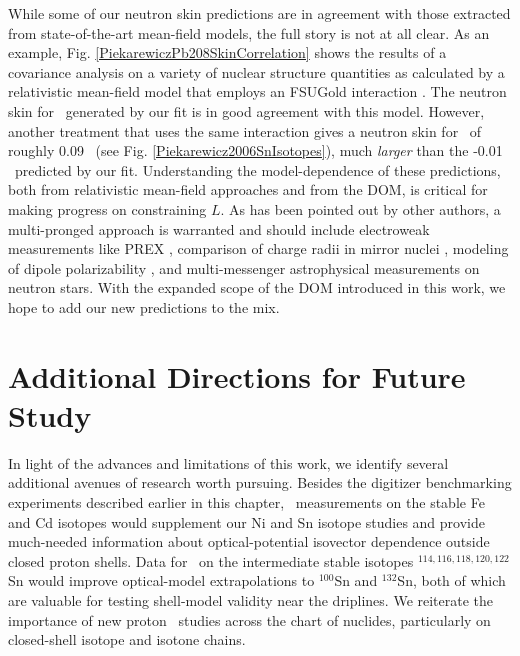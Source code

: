 While some of our neutron skin predictions are in agreement with those extracted
from state-of-the-art mean-field models, the
full story is not at all clear.
As an example, Fig. \ref{PiekarewiczPb208SkinCorrelation}
shows the results of a covariance analysis on a variety of nuclear structure
quantities as calculated by a relativistic mean-field model 
that employs an FSUGold interaction \cite{Fattoyev2012}.
The neutron
skin for \pbEight\ generated by our fit is in good agreement with this model.
However, another treatment that uses the same interaction
\cite{Piekarewicz2006} gives a neutron skin for \snTwelve\ of roughly 0.09
\femto\meter\ (see Fig. \ref{Piekarewicz2006SnIsotopes}), much \textit{larger} than the
-0.01 \femto\meter\ predicted by our fit.
Understanding the model-dependence of these predictions, both from relativistic mean-field
approaches and from the DOM, is critical for making progress on constraining
$L$. As has been pointed out by other authors, a multi-pronged approach 
is warranted and should include electroweak measurements like PREX \cite{Horowitz2014}, comparison of
charge radii in mirror nuclei \cite{Brown2017}, modeling of dipole
polarizability \cite{Piekarewicz2006}, and multi-messenger astrophysical
measurements on neutron stars. With the expanded scope of the DOM introduced in
this work, we hope to add our new predictions to the mix.

\section{Additional Directions for Future Study}
In light of the advances and limitations of this work, we identify several
additional avenues of research worth pursuing.
Besides the digitizer benchmarking experiments described earlier
in this chapter, \tot\ measurements on the stable Fe and Cd isotopes would
supplement our Ni and Sn isotope studies and provide much-needed information
about optical-potential isovector dependence outside closed proton shells.
Data for \tot\ on the intermediate stable isotopes $^{114,116,118,120,122}$Sn
would improve optical-model extrapolations to $^{100}$Sn and $^{132}$Sn,
both of which are valuable for testing shell-model validity near the driplines.
We reiterate the importance of new proton \rxn\
studies across the chart of nuclides, particularly on closed-shell isotope and isotone
chains.

